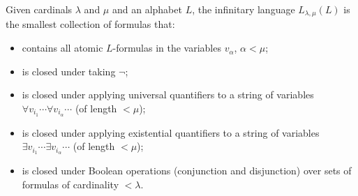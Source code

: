 Given cardinals $\lambda$ and $\mu$ and an alphabet $L$, the infinitary language $L_{\lambda,\mu}(L)$ is the smallest collection of formulas that:
\begin{itemize}
\item contains all atomic $L$-formulas in the variables $v_\alpha$, $\alpha < \mu$;
\item is closed under taking $\neg$;
\item is closed under applying universal quantifiers to a string of variables $\forall v_{i_1} \cdots \forall v_{i_\alpha} \cdots$ (of length $< \mu$);
\item is closed under applying existential quantifiers to a string of variables $\exists v_{i_1} \cdots \exists v_{i_\alpha} \cdots$ (of length $< \mu$);
\item is closed under Boolean operations (conjunction and disjunction) over sets of formulas of cardinality $< \lambda$.
\end{itemize}
